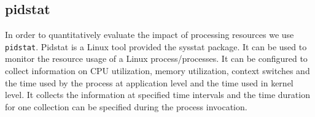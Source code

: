 \subsection{pidstat}
In order to quantitatively evaluate the impact of processing resources we use \texttt{pidstat}.
Pidstat is a Linux tool provided the sysstat package.
It can be used to monitor the resource usage of a Linux process/processes.
It can be configured to collect information on CPU utilization, memory utilization, context switches and the time  used by the process at application level and the time used in kernel level.
It collects the information at specified time intervals and the time duration for one collection can be specified during the process invocation.

